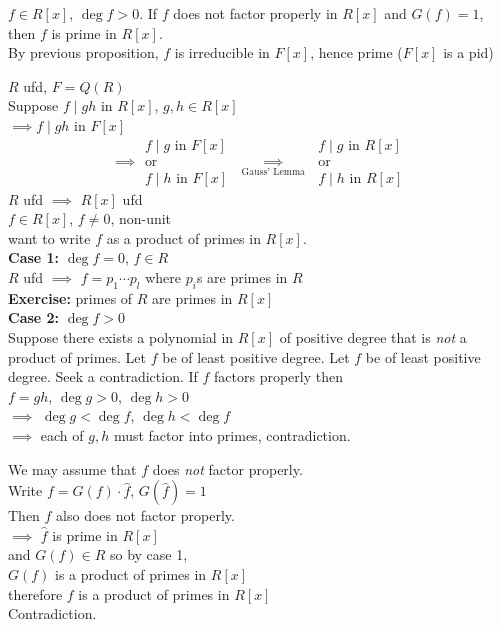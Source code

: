 \cor $f\in R[x]$, $\deg f>0$.  If $f$ does not factor properly in $R[x]$ and $G(f)=1$, then $f$ is prime in $R[x]$. \\
\pf By previous proposition, $f$ is irreducible in $F[x]$, hence prime ($F[x]$ is a pid)

$R$ ufd, $F=Q(R)$ \\
Suppose $f\mid gh$ in $R[x]$, $g,h\in R[x]$ \\
$\implies f\mid gh$ in $F[x]$
\[ \implies \begin{gathered}f\mid g \text{ in $F[x]$} \\
\text{or} \\
f\mid h \text{ in $F[x]$}
\end{gathered} \;\underset{\text{Gauss' Lemma}}{\implies}\; \begin{gathered}
f\mid g \text{ in $R[x]$} \\
\text{or} \\
f\mid h \text{ in $R[x]$}
\end{gathered} \]
\thm $R$ ufd $\implies$ $R[x]$ ufd \\
\pf $f\in R[x]$, $f\neq0$, non-unit \\
want to write $f$ as a product of primes in $R[x]$. \\
\textbf{Case 1: }$\deg f=0$, $f\in R$ \\
$R$ ufd $\implies$ $f=p_1\dotsm p_l$ where $p_i$s are primes in $R$ \\
\textbf{Exercise: }primes of $R$ are primes in $R[x]$ \\
\textbf{Case 2: }$\deg f>0$ \\
Suppose there exists a polynomial in $R[x]$ of positive degree that is \emph{not} a product of primes.  Let $f$ be of least positive degree.  Let $f$ be of least positive degree.  Seek a contradiction.  If $f$ factors properly then \\
$f=gh$, $\deg g>0$, $\deg h>0$ \\
$\implies$ $\deg g<\deg f$, $\deg h<\deg f$ \\
$\implies$ each of $g,h$ must factor into primes, contradiction.

We may assume that $f$ does \emph{not} factor properly. \\
Write $f=G(f)\cdot\hat f$, $G(\hat f)=1$ \\
Then $\hat f$ also does not factor properly. \\
$\implies$ $\hat f$ is prime in $R[x]$ \\
and $G(f)\in R$ so by case 1, \\
$G(f)$ is a product of primes in $R[x]$ \\
therefore $f$ is a product of primes in $R[x]$ \\
Contradiction.
